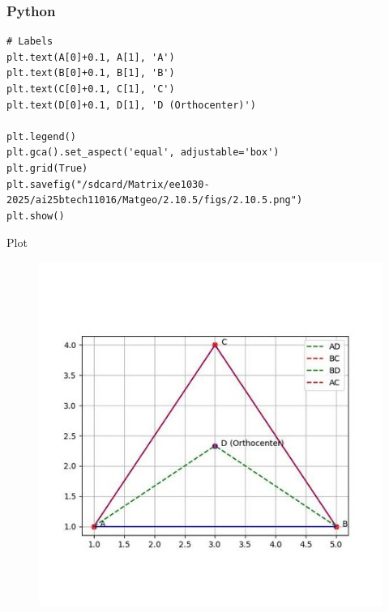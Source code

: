 \documentclass{beamer}
\begin{document}
\begin{frame}[fragile]
    \frametitle{Python}
    \begin{lstlisting}
# Labels
plt.text(A[0]+0.1, A[1], 'A')
plt.text(B[0]+0.1, B[1], 'B')
plt.text(C[0]+0.1, C[1], 'C')
plt.text(D[0]+0.1, D[1], 'D (Orthocenter)')

plt.legend()
plt.gca().set_aspect('equal', adjustable='box')
plt.grid(True)
plt.savefig("/sdcard/Matrix/ee1030-2025/ai25btech11016/Matgeo/2.10.5/figs/2.10.5.png")
plt.show()
\end{lstlisting}
\end{frame}
\begin{frame}{Plot}


\begin{figure}[h]
    \centering
    \includegraphics[scale=0.5]{figs/2.10.5.jpg}
    \caption{}
    \label{fig:1}
\end{figure}
\end{frame}
\end{document}
